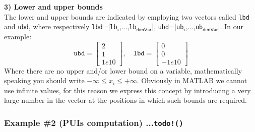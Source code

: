 \noindent
\textbf{\textsf{3) Lower and upper bounds}}\\
The lower and upper bounds are indicated by employing two vectors called \texttt{lbd} and \texttt{ubd}, where respectively \texttt{lbd}=[\texttt{lb}$_i$,...,\texttt{lb}$_\textsf{dimVar}$], \texttt{ubd}=[\texttt{ub}$_i$,...,\texttt{ub}$_\textsf{dimVar}$]. In our example:
\begin{equation*}
    \texttt{ubd} = \begin{bmatrix}
        2\\1\\1e10
    \end{bmatrix}, \quad
    \texttt{lbd} = \begin{bmatrix}
        0\\0\\-1e10
    \end{bmatrix}
\end{equation*}
Where there are no upper and/or lower bound on a variable, mathematically speaking you should write $-\infty \le x_i \le +\infty$. Obviously in MATLAB we cannot use infinite values, for this reason we express this concept by introducing a very large number in the vector at the positions in which such bounds are required.

\subsubsection{Example \#2 (PUIs computation) ...\texttt{todo!()}}



 







